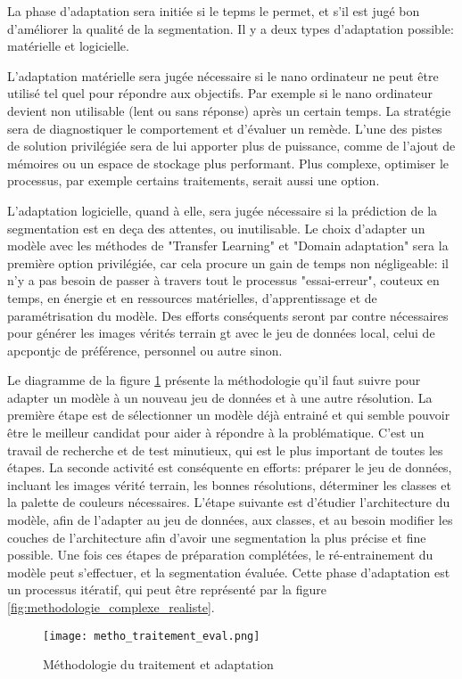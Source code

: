 ﻿\par La phase d'adaptation sera initiée si le tepms le permet, et s'il est jugé bon d'améliorer la qualité de la segmentation. Il y a deux types d'adaptation possible: matérielle et logicielle.
\par L'adaptation matérielle sera jugée nécessaire si le nano ordinateur ne peut être utilisé tel quel pour répondre aux objectifs. Par exemple si le nano ordinateur devient non utilisable (lent ou sans réponse) après un certain temps. La stratégie sera de diagnostiquer le comportement et d'évaluer un remède. L'une des pistes de solution privilégiée sera de lui apporter plus de puissance, comme de l'ajout de mémoires ou un espace de stockage plus performant. Plus complexe, optimiser le processus, par exemple certains traitements, serait aussi une option.
\par L'adaptation logicielle, quand à elle, sera jugée nécessaire si la prédiction de la segmentation est en deça des attentes, ou inutilisable. Le choix d'adapter un modèle avec les méthodes de "Transfer Learning" et "Domain adaptation" sera la première option privilégiée, car cela procure un gain de temps non négligeable: il n'y a pas besoin de passer à travers tout le processus "essai-erreur", couteux en temps, en énergie et en ressources matérielles, d'apprentissage et de paramétrisation du modèle. Des efforts conséquents seront par contre nécessaires pour générer les images vérités terrain \acrfull{gt} avec le jeu de données local, celui de \acrlong{apcpontjc} de préférence, personnel ou autre sinon.
\par Le diagramme de la figure \ref{fig:metho_adaptation} présente la méthodologie qu'il faut suivre pour adapter un modèle à un nouveau jeu de données et à une autre résolution. La première étape est de sélectionner un modèle déjà entrainé et qui semble pouvoir être le meilleur candidat pour aider à répondre à la problématique. C'est un travail de recherche et de test minutieux, qui est le plus important de toutes les étapes. La seconde activité est conséquente en efforts: préparer le jeu de données, incluant les images vérité terrain, les bonnes résolutions, déterminer les classes et la palette de couleurs nécessaires. L'étape suivante est d'étudier l'architecture du modèle, afin de l'adapter au jeu de données, aux classes, et au besoin modifier les couches de l'architecture afin d'avoir une segmentation la plus précise et fine possible. Une fois ces étapes de préparation complétées, le ré-entrainement du modèle peut s'effectuer, et la segmentation évaluée. Cette phase d'adaptation est un processus itératif, qui peut être représenté par la figure \ref{fig:methodologie_complexe_realiste}.
\label{metho_adaptation}
\begin{figure}[H]
    \centering
    \texttt{[image: metho\_traitement\_eval.png]}
    \caption{Méthodologie du traitement et adaptation}
    \label{fig:metho_adaptation}
\end{figure}
